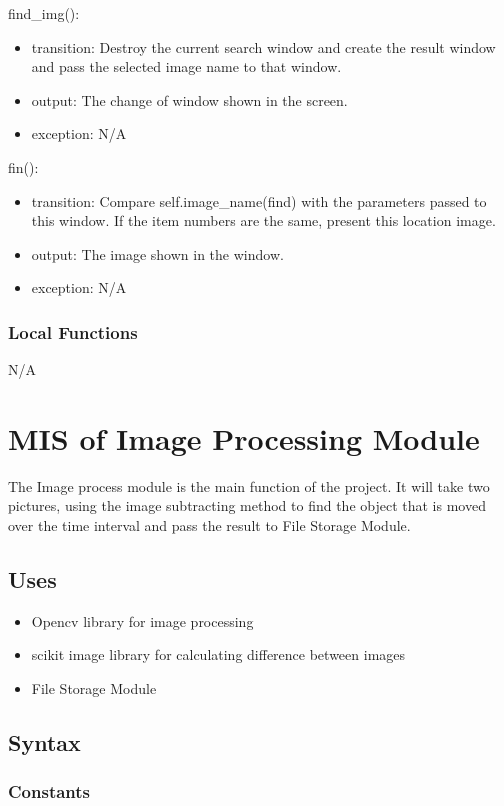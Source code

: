 \documentclass[12pt, titlepage]{article}
\begin{document}
\noindent find\_img():
\begin{itemize} 
\item transition: Destroy the current search window and create the result window and pass the selected image name to that window.
\item output: The change of window shown in the screen.
\item exception: N/A
\end{itemize}
\noindent fin():
\begin{itemize} 
\item transition: Compare self.image\_name(find) with the parameters passed to this window. If the item numbers are the same, present this location image.
\item output: The image shown in the window.
\item exception: N/A
\end{itemize}
\subsubsection{Local Functions}

N/A

\newpage

\section{MIS of Image Processing Module} 

 The Image process module is the main function of the project. It will take two pictures, using the image subtracting method to find the object that is moved over the time interval and pass the result to File Storage Module. 

\subsection{Uses}

\begin{itemize}
\item Opencv library for image processing
\item scikit image library for calculating difference between images
\item File Storage Module
\end{itemize}
\subsection{Syntax}

\subsubsection{Constants}
\end{document}
